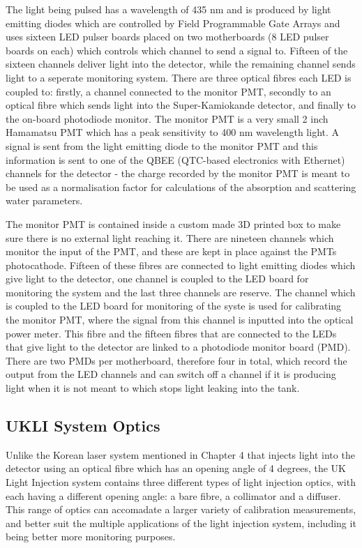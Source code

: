 The light being pulsed has a wavelength of 435 nm and is produced by light emitting diodes which are controlled by Field Programmable Gate Arrays and uses sixteen LED pulser boards placed on two motherboards (8 LED pulser boards on each) which controls which channel to send a signal to. Fifteen of the sixteen channels deliver light into the detector, while the remaining channel sends light to a seperate monitoring system. There are three optical fibres each LED is coupled to: firstly, a channel connected to the monitor PMT, secondly to an optical fibre which sends light into the Super-Kamiokande detector, and finally to the on-board photodiode monitor. The monitor PMT is a very small 2 inch Hamamatsu PMT which has a peak sensitivity to 400 nm wavelength light. A signal is sent from the light emitting diode to the monitor PMT and this information is sent to one of the QBEE (QTC-based electronics with Ethernet) channels for the detector - the charge recorded by the monitor PMT is meant to be used as a normalisation factor for calculations of the absorption and scattering water parameters. 
\newline

The monitor PMT is contained inside a custom made 3D printed box to make sure there is no external light reaching it. There are nineteen channels which monitor the input of the PMT, and these are kept in place against the PMTs photocathode. Fifteen of these fibres are connected to light emitting diodes which give light to the detector, one channel is coupled to the LED board for monitoring the system and the last three channels are reserve. The channel which is coupled to the LED board for monitoring of the syste is used for calibrating the monitor PMT, where the signal from this channel is inputted into the optical power meter. This fibre and the fifteen fibres that are connected to the LEDs that give light to the detector are linked to a photodiode monitor board (PMD). There are two PMDs per motherboard, therefore four in total, which record the output from the LED channels and can switch off a channel if it is producing light when it is not meant to which stops light leaking into the tank. 

\subsection{UKLI System Optics}

Unlike the Korean laser system mentioned in Chapter 4 that injects light into the detector using an optical fibre which has an opening angle of 4 degrees, the UK Light Injection system contains three different types of light injection optics, with each having a different opening angle: a bare fibre, a collimator and a diffuser. This range of optics can accomadate a larger variety of calibration measurements, and better suit the multiple applications of the light injection system, including it being better more monitoring purposes. 

